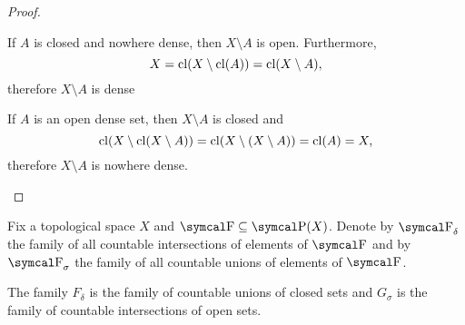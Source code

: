 \begin{proof}
\begin{description}
    \mbox{}
    \begin{description}
      \Implies If \( A \) is closed and nowhere dense, then \( X \setminus A \) is open. Furthermore,
      \begin{equation*}
        X
        =
        \operatorname{cl}(X \setminus \operatorname{cl}(A))
        =
        \operatorname{cl}(X \setminus A),
      \end{equation*}
      therefore \( X \setminus A \) is dense

      \ImpliedBy If \( A \) is an open dense set, then \( X \setminus A \) is closed and
      \begin{equation*}
        \operatorname{cl}(X \setminus \operatorname{cl}(X \setminus A))
        =
        \operatorname{cl}(X \setminus (X \setminus A))
        =
        \operatorname{cl}(A)
        =
        X,
      \end{equation*}
      therefore \( X \setminus A \) is nowhere dense.
    \end{description}
  \end{description}
\end{proof}

\begin{definition}\label{def:borel_algebra}
  Fix a topological space \( X \) and \( \CF \subseteq \Power(X) \). Denote by \( \CF_\delta \) the family of all countable intersections of elements of \( \CF \) and by \( \CF_\sigma \) the family of all countable unions of elements of \( \CF \).

  The family \( F_\delta \) is the family of countable unions of closed sets and \( G_\sigma \) is the family of countable intersections of open sets.
\end{definition}
